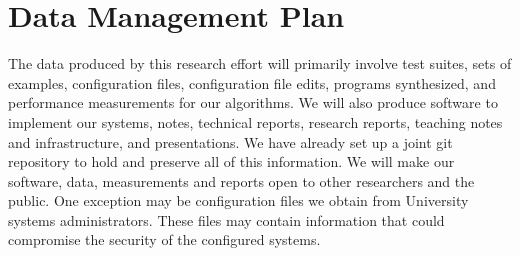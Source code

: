 \section*{Data Management Plan}

The data produced by this research effort will primarily involve test
suites, sets of examples, configuration files, configuration file
edits, programs synthesized, and performance measurements for our
algorithms.  We will also produce software to implement our systems,
notes, technical reports, research reports, teaching notes and
infrastructure, and presentations.  We have already set up a joint git
repository to hold and preserve all of this information.  We will make
our software, data, measurements and reports open to other researchers
and the public.  One exception may be configuration files we obtain
from University systems administrators.  These files may contain
information that could compromise the security of the configured
systems.


